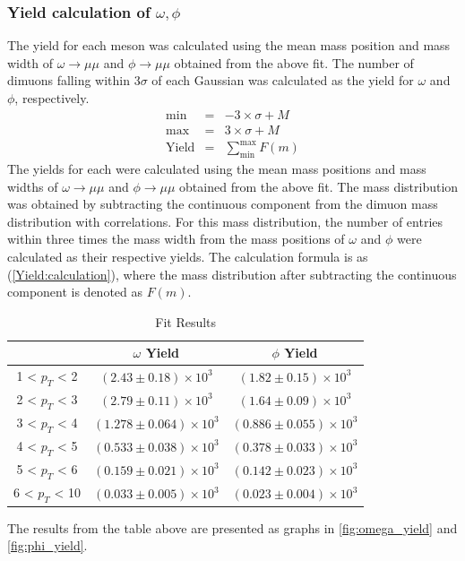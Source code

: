         \subsubsection{Yield calculation of $\omega,\phi$} 
            The yield for each meson was calculated using the mean mass position and mass width of $\omega \rightarrow \mu\mu$ and $\phi \rightarrow \mu\mu$ obtained from the above fit. The number of dimuons falling within 3$\sigma$ of each Gaussian was calculated as the yield for $\omega$ and $\phi$, respectively.
            \begin{eqnarray}
                \mathrm{min} &=&  -3 \times \sigma + M \\
                \mathrm{max} &=&  3 \times \sigma + M \\
                \mathrm{Yield} &=& \sum_{\mathrm{min}}^{\mathrm{max}} F(m)
                \label{Yield:calculation}
            \end{eqnarray}
            The yields for each were calculated using the mean mass positions and mass widths of \(\omega \rightarrow \mu\mu\) and \(\phi \rightarrow \mu\mu\) obtained from the above fit. The mass distribution was obtained by subtracting the continuous component from the dimuon mass distribution with correlations. For this mass distribution, the number of entries within three times the mass width from the mass positions of \(\omega\) and \(\phi\) were calculated as their respective yields. The calculation formula is as (\ref{Yield:calculation}), where the mass distribution after subtracting the continuous component is denoted as \(F(m)\).
            \begin{table}[htbp]
                \centering
                \caption{Fit Results}
                \begin{tabular}{|c||c|c|}
                    \hline
                    & $\omega$ Yield & $\phi$ Yield \\ \hline \hline
                    1 < $p_{T}$ < 2 &$(2.43\pm0.18)\times10^3$& $(1.82\pm0.15)\times10^3$\\ \hline
                    2 < $p_{T}$ < 3 &$(2.79\pm0.11)\times10^3$& $(1.64\pm0.09)\times10^3$\\ \hline
                    3 < $p_{T}$ < 4 &$(1.278\pm0.064)\times10^3$& $(0.886\pm0.055)\times10^3$\\ \hline
                    4 < $p_{T}$ < 5 &$(0.533\pm0.038)\times10^3$& $(0.378\pm0.033)\times10^3$\\ \hline
                    5 < $p_{T}$ < 6 &$(0.159\pm0.021)\times10^3$& $(0.142\pm0.023)\times10^3$\\ \hline
                    6 < $p_{T}$ < 10 &$(0.033\pm0.005)\times10^3$& $(0.023\pm0.004)\times10^3$\\ \hline     
                \end{tabular}
                \label{Analysis:Dimuon:Yield:Results}
            \end{table}
            The results from the table above are presented as graphs in \ref{fig:omega_yield} and \ref{fig:phi_yield}.

